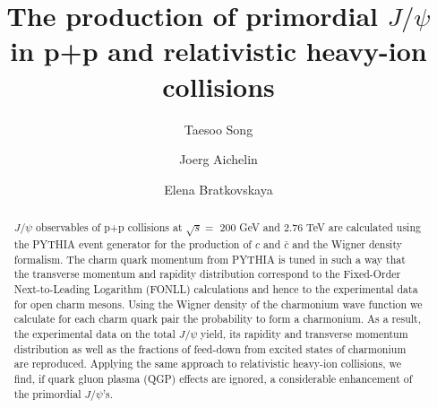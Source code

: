 \documentclass[twocolumn,aps,superscriptaddress,showpacs,nofootinbib,floatfix]{revtex4}
\begin{document}

\title{The production of primordial $J/\psi$ in p+p and relativistic heavy-ion collisions}


\author{Taesoo Song}

\author{Joerg Aichelin}


\author{Elena Bratkovskaya}


\begin{abstract}
$J/\psi$ observables of  p+p collisions at $\sqrt{s}=$ 200 GeV and 2.76 TeV are calculated using the PYTHIA event generator for the production of $c$ and $\bar c$ and the Wigner density formalism. The charm quark momentum from PYTHIA is tuned in such a way that the transverse momentum and rapidity distribution correspond to the Fixed-Order Next-to-Leading Logarithm (FONLL) calculations and hence to the experimental data for open charm mesons. Using the Wigner density of the charmonium wave function we  calculate for each charm quark pair the  probability to form a charmonium.  As a result, the experimental data on the total $J/\psi$ yield,  its rapidity and transverse momentum distribution as well as the fractions of feed-down from excited states of charmonium are reproduced. Applying the same approach to relativistic heavy-ion collisions, we find, if quark gluon plasma (QGP) effects are ignored, a considerable enhancement of the primordial $J/\psi$'s. 
\end{abstract}

\end{document}
